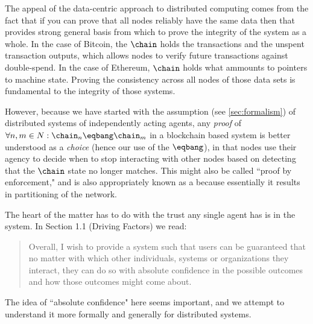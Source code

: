 \documentclass[twocolumn,showpacs,%
  nofootinbib,aps,superscriptaddress,%
  eqsecnum,prd,notitlepage,showkeys,10pt]{revtex4-1}
\begin{document}
The appeal of the data-centric approach to distributed computing comes from the fact that if you can prove that all nodes reliably have the same data then that provides strong general basis from which to prove the integrity of the system as a whole.  In the case of Bitcoin, the $\chain$ holds the transactions and the unspent transaction outputs, which allows nodes to verify future transactions against double-spend. In the case of Ethereum, $\chain$ holds what ammounts to pointers to machine state. Proving the consistency across all nodes of those data sets is fundamental to the integrity of those systems.

However, because we have started with the assumption (see \ref{sec:formalism}) of distributed systems of independently acting agents, any \textit{proof} of  $\forall n,m \in N: \chain_n\eqbang\chain_m$ in a blockchain based system is better understood as a \textit{choice} (hence our use of the $\eqbang$),  in that nodes use their agency to decide when to stop interacting with other nodes based on detecting that the $\chain$ state no longer matches.  This might also be called  ``proof by enforcement," and is also appropriately known as a  because essentially it results in partitioning of the network.

The heart of the matter has to do with the trust any single agent has is in the system.  In \cite{yellowpaper} Section 1.1 (Driving Factors) we read:
\begin{quote}
Overall, I wish to provide a system such that users can be guaranteed that no matter with which other individuals, systems or organizations they interact, they can do so with absolute confidence in the possible outcomes and how those outcomes might come about.
\end{quote}

The idea of ``absolute confidence" here seems important, and we attempt to understand it more formally and generally for distributed systems.
\end{document}
